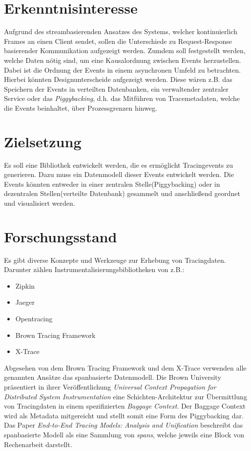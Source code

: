 \documentclass[a4paper]{article}
\begin{document}
\section{Erkenntnisinteresse}
\label{section:Erkenntnisinteresse}
	Aufgrund des streambasierenden Ansatzes des Systems, welcher kontinuierlich Frames an einen Client sendet, sollen die Unterschiede zu Request-Response basierender Kommunikation aufgezeigt werden. Zumdem soll festgestellt werden, welche Daten nötig sind, um eine Kausalordnung zwischen Events herzustellen. Dabei ist die Ordnung der Events in einem asynchronen Umfeld zu betrachten. Hierbei könnten Designunterscheide aufgezeigt werden. Diese wären z.B. das Speichern der Events in verteilten Datenbanken, ein verwaltender zentraler Service oder das \emph{Piggybacking}, d.h. das Mitführen von Tracemetadaten, welche die Events beinhaltet, über Prozessgrenzen hinweg.  
	
\section{Zielsetzung}
\label{section:Erkenntnisinteresse}
	Es soll eine Bibliothek entwickelt werden, die es ermöglicht Tracingevents zu generieren. Dazu muss ein Datenmodell dieser Events entwickelt werden. Die Events könnten entweder in einer zentralen  Stelle(Piggybacking) oder in dezentralen Stellen(verteilte Datenbank) gesammelt und anschließend geordnet und visualisiert werden. 
	
\section{Forschungsstand}
\label{section:Erkenntnisinteresse}
	Es gibt diverse Konzepte und Werkzeuge zur Erhebung von Tracingdaten. Darunter zählen Instrumentalisierungsbibliotheken von z.B.:
	\begin{itemize}
		\item Zipkin
		\item Jaeger
		\item Opentracing
		\item Brown Tracing Framework
		\item X-Trace
	\end{itemize}
	Abgesehen von dem Brown Tracing Framework und dem X-Trace verwenden alle genannten Ansätze das spanbasierte Datenmodell. Die Brown University präsentiert in ihrer Veröffentlichung \emph{Universal Context Propagation for Distributed System Instrumentation} eine Schichten-Architektur zur Übermittlung von Tracingdaten in einem spezifizierten \emph{Baggage Context}. Der Baggage Context wird als Metadata mitgereicht und stellt somit eine Form des Piggybacking dar. Das Paper \emph{End-to-End Tracing Models: Analysis and Unification} beschreibt das spanbasierte Modell als eine Sammlung von \emph{spans}, welche jeweils eine Block von Rechenarbeit darstellt.
\end{document}
